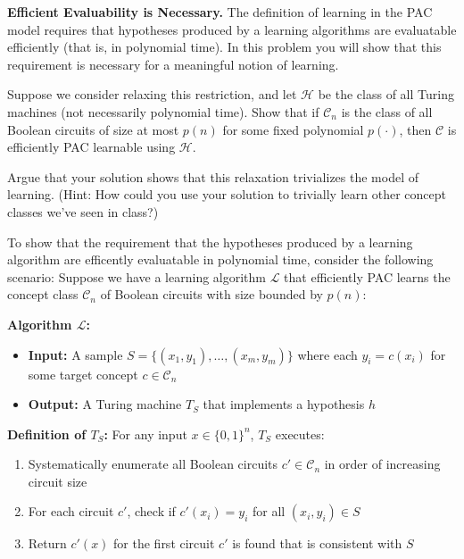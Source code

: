\documentclass[11pt]{article}
\newcommand*{\C}{{\mathcal C}}
\newcommand*{\Hp}{{\mathcal H}}
\DeclareMathOperator{\1}{\mathbbm{1}}
\begin{document}
\begin{problem} [10pts] \textbf{Efficient Evaluability is Necessary.}
The definition of learning in the PAC model requires that hypotheses produced by a learning algorithms are evaluatable efficiently (that is, in polynomial time). In this problem you will show that this requirement is necessary for a meaningful notion of learning.

Suppose we consider relaxing this restriction, and let $\Hp$ be the class of all Turing machines (not necessarily polynomial time). Show that if $\C_n$ is the class of all Boolean circuits of size at most $p(n)$ for some fixed polynomial $p(\cdot)$, then $\C$ is efficiently PAC learnable using $\Hp$.

Argue that your solution shows that this relaxation trivializes the model of learning. (Hint: How could you use your solution to trivially learn other concept classes we've seen in class?)

To show that the requirement that the hypotheses produced by a learning algorithm are efficently evaluatable in polynomial time, consider the following scenario: Suppose we have a learning algorithm $\mathcal{L}$ that efficiently PAC learns the concept class $\mathcal{C}_n$ of Boolean circuits with size bounded by $p(n)$:

\textbf{Algorithm $\mathcal{L}$:}
\begin{itemize}
	\item \textbf{Input:} A sample $S = \{(x_1, y_1), \ldots, (x_m, y_m)\}$ where each $y_i = c(x_i)$ for some target concept $c \in \mathcal{C}_n$
	\item \textbf{Output:} A Turing machine $T_S$ that implements a hypothesis $h$
\end{itemize}

\textbf{Definition of $T_S$:} For any input $x \in \{0,1\}^n$, $T_S$ executes:
\begin{enumerate}
	\item Systematically enumerate all Boolean circuits $c' \in \mathcal{C}_n$ in order of increasing circuit size
	\item For each circuit $c'$, check if $c'(x_i)=y_i$ for all $(x_i, y_i) \in S$
	\item Return $c'(x)$ for the first circuit $c'$ is found that is consistent with $S$
\end{enumerate}


\end{problem}
\end{document}
